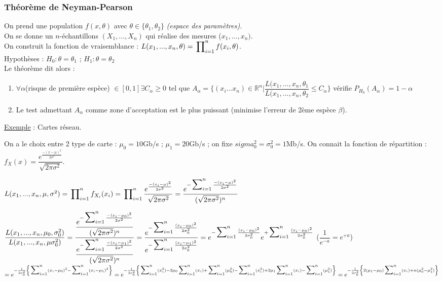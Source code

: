 \documentclass{article}
\newcommand{\R}{\mathbb{R}}
\newcommand{\gau}{\dfrac{e^\frac{-(x-\mu)^2}{2\sigma^2}}{\sqrt{2\pi\sigma^2}}}
\newcommand{\esum}[1]{\dfrac{ e^{-\sideset{}{_{i=1}^n}\sum \frac{-(x_i-#1)^2}{2\sigma^2}}} {(\sqrt{2\pi\sigma^2})^n}}
\newcommand{\sumin}{\sideset{}{_{i=1}^n}\sum}
\begin{document}
\subsubsection{Théorème de Neyman-Pearson}

\noindent On prend une population $f(x,\theta)$ avec $\theta\in\{\theta_1,\theta_2\}$ \textit{(espace des paramètres)}.\\
On se donne un $n$-échantillons $(X_1,...,X_n)$ qui réalise des mesures ($x_1,...,x_n)$. \\
On construit la fonction de vraisemblance : $L(x_1,...,x_n,\theta) = \sideset{}{_{i=1}^n}\prod f(x_i,\theta)$. \\

Hypothèses : $H_0 : \theta = \theta_1$ ; $H_1 : \theta = \theta_2$ \\

Le théorème dit alors : 

\begin{enumerate}
\item $\forall \alpha$(risque de première espèce) $\in [0,1] \exists C_\alpha \geq 0$ tel que $A_\alpha = 
\{ (x_i...x_n) \in \R^n | \dfrac{L(x_1,...,x_n,\theta_1}{L(x_1,...,x_n,\theta_2} \leq C_\alpha \}$ vérifie 
$P_{H_0}(A_\alpha) = 1-\alpha$
\item Le test admettant $A_\alpha$ comme zone d'acceptation est le plus puissant (minimise l'erreur de 2ème espèce $\beta$).
\end{enumerate}

\noindent\underline{Exemple} : Cartes réseau.

\noindent On a le choix entre 2 type de carte : $\mu_0 = 10$Gb/s ; $\mu_1 = 20$Gb/s ; on fixe $sigma^2_0 = \sigma^2_0 = 1$Mb/s.
On connait la fonction de répartition : $f_X(x) = \gau$.

\noindent $L(x_1,...,x_n,\mu,\sigma^2) = \sideset{}{^n_{i=1}}\prod f_{X_i}(x_i) \\
= \sideset{}{^n_{i=1}}\prod\dfrac{e^\frac{-(x_i-\mu)^2}{2\sigma^2}}{\sqrt{2\pi\sigma^2}}\\
= \esum{\mu}$ 

$\dfrac{L(x_1,...,x_n,\mu_0,\sigma_0^2)}{L(x_1,...,x_n,\mu\sigma_0^2)} \\
= \dfrac{\esum{\mu_0}}{\esum{\mu_1}} \\
= \dfrac{e^{-\sumin \frac{(x_i - \mu_0)^2}{2\sigma_0^2} }} {e^{-\sumin \frac{(x_i - \mu_1)^2}{2\sigma_0^2} }} \\
= e^{-\sumin \frac{(x_i - \mu_0)^2}{2\sigma_0^2} } {e^{+\sumin \frac{(x_i - \mu_0)^2}{2\sigma_0^2} }}$
($\dfrac{1}{e^{-a}} = e^{+a}$) \\ $
= e^{-\frac{1}{2\sigma_0^2} \left\{ \sumin(x_i-\mu_0)^2 - \sumin(x_i-\mu_1)^2 \right\} } \\
= e^{-\frac{1}{2\sigma_0^2} \left\{ \sumin(x_i^2) - 2\mu_0\sumin(x_i) + \sumin(\mu_0^2) - \sumin(x_i^2)
+ 2\mu_1\sumin(x_i) - \sumin(\mu_1^2) \right\} } \\
= e^{-\frac{1}{2\sigma_0^2} \left\{ 2(\mu_1-\mu_0)\sumin(x_i) + n(\mu_0^2-\mu_1^2) \right\} } \\$
\end{document}
